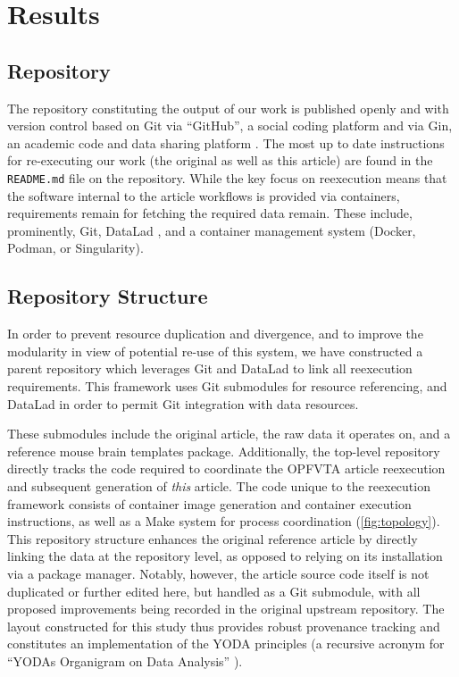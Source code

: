 \section{Results}

\subsection{Repository}

The repository constituting the output of our work is published openly and with version control based on Git \cite{git} via “GitHub”, a social coding platform \cite{me} and via Gin, an academic code and data sharing platform \cite{me-gin}.
The most up to date instructions for re-executing our work (the original as well as this article) are found in the \texttt{README.md} file on the repository.
While the key focus on reexecution means that the software internal to the article workflows is provided via containers, requirements remain for fetching the required data remain.
These include, prominently, Git, DataLad \cite{datalad}, and a container management system (Docker, Podman, or Singularity).

\subsection{Repository Structure}

In order to prevent resource duplication and divergence, and to improve the modularity in view of potential re-use of this system, we have constructed a parent repository which leverages Git and DataLad to link all reexecution requirements.
This framework uses Git submodules for resource referencing, and DataLad in order to permit Git integration with data resources.

These submodules include the original article, the raw data it operates on, and a reference mouse brain templates package.
Additionally, the top-level repository directly tracks the code required to coordinate the OPFVTA article reexecution and subsequent generation of \emph{this} article.
The code unique to the reexecution framework consists of container image generation and container execution instructions, as well as a Make system for process coordination (\cref{fig:topology}).
This repository structure enhances the original reference article by directly linking the data at the repository level, as opposed to relying on its installation via a package manager.
Notably, however, the article source code itself is not duplicated or further edited here, but handled as a Git submodule, with all proposed improvements being recorded in the original upstream repository.
The layout constructed for this study thus provides robust provenance tracking and constitutes an implementation of the YODA principles (a recursive acronym for “YODAs Organigram on Data Analysis” \cite{yoda}).

